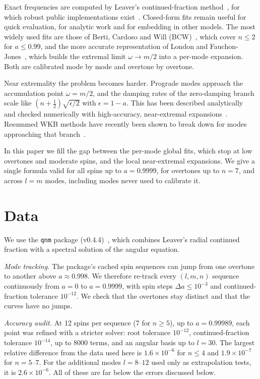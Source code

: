 \documentclass[prd,twocolumn,superscriptaddress,nofootinbib]{revtex4-2}
\begin{document}
Exact frequencies are computed by Leaver's continued-fraction method~\cite{Leaver:1985ax}, for which robust public
implementations exist~\cite{Stein:2019mop}. Closed-form fits remain useful for quick evaluation, for analytic work
and for embedding in other models. The most widely used fits are those of Berti, Cardoso and Will
(BCW)~\cite{Berti:2005ys}, which cover $n\le 2$ for $a\le 0.99$, and the more accurate representation of London and
Fauchon-Jones~\cite{London:2018nxs}, which builds the extremal limit $\omega\to m/2$ into a per-mode expansion. Both
are calibrated mode by mode and overtone by overtone.

Near extremality the problem becomes harder. Prograde modes approach the accumulation point $\omega=m/2$, and the
damping rates of the zero-damping branch scale like $(n+\tfrac12)\sqrt{\epsilon/2}$ with $\epsilon=1-a$. This has
been described analytically~\cite{Hod:2008zz,Yang:2012pj,Yang:2013uba} and checked numerically with
high-accuracy, near-extremal expansions~\cite{Cook:2014cta}. Resummed WKB methods have recently been shown to break
down for modes approaching that branch~\cite{Hu:2026resum}.

In this paper we fill the gap between the per-mode global fits, which stop at low overtones and moderate spins, and
the local near-extremal expansions. We give a single formula valid for all spins up to $a=0.9999$, for overtones up
to $n=7$, and across $l=m$ modes, including modes never used to calibrate it.

\section{Data}\label{sec:data}

We use the \texttt{qnm} package (v0.4.4)~\cite{Stein:2019mop}, which combines Leaver's radial continued fraction with
a spectral solution of the angular equation.

\textit{Mode tracking.} The package's cached spin sequences can jump from one overtone to another above
$a\approx 0.998$. We therefore re-track every $(l,m,n)$ sequence continuously from $a=0$ to $a=0.9999$, with spin
steps $\Delta a\le 10^{-3}$ and continued-fraction tolerance $10^{-12}$. We check that the overtones stay distinct and
that the curves have no jumps.

\textit{Accuracy audit.} At 12 spins per sequence (7 for $n\ge5$), up to $a=0.99989$, each point was refined with a
stricter solver: root tolerance $10^{-12}$, continued-fraction tolerance $10^{-14}$, up to 8000 terms, and an angular
basis up to $l=30$. The largest relative difference from the data used here is $1.6\times10^{-6}$ for $n\le4$ and
$1.9\times10^{-7}$ for $n=5$--$7$. For the additional modes $l=8$--$12$ used only as extrapolation tests, it is
$2.6\times10^{-6}$. All of these are far below the errors discussed below.
\end{document}

